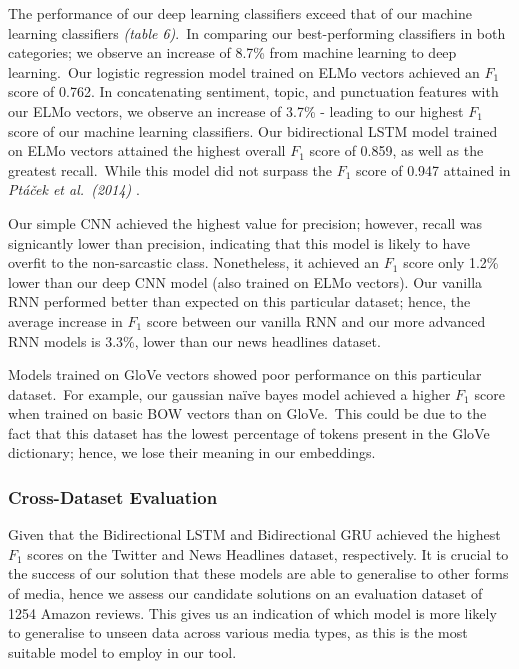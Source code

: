 \documentclass[12pt,a4paper]{article}
\begin{document}
\noindent The performance of our deep learning classifiers exceed that of our machine learning classifiers \textit{(table 6)}.\ In comparing our best-performing classifiers in both categories; we observe an increase of 8.7\% from machine learning to deep learning.\ Our logistic regression model trained on ELMo vectors achieved an $F_1$ score of 0.762. In concatenating sentiment, topic, and punctuation features with our ELMo vectors, we observe an increase of 3.7\% - leading to our highest $F_1$ score of our machine learning classifiers. Our bidirectional LSTM model trained on ELMo vectors attained the highest overall $F_1$ score of 0.859, as well as the greatest recall.\ While this model did not surpass the $F_1$ score of 0.947 attained in \textit{Pt\'a\v{c}ek et al.\ (2014)} \cite{ptavcek2014sarcasm}. 

Our simple CNN achieved the highest value for precision; however, recall was signicantly lower than precision, indicating that this model is likely to have overfit to the non-sarcastic class. Nonetheless, it achieved an $F_1$ score only 1.2\% lower than our deep CNN model (also trained on ELMo vectors). Our vanilla RNN performed better than expected on this particular dataset; hence, the average increase in $F_1$ score between our vanilla RNN and our more advanced RNN models is 3.3\%, lower than our news headlines dataset.

Models trained on GloVe vectors showed poor performance on this particular dataset.\ For example, our gaussian na\"{i}ve bayes model achieved a higher $F_1$ score when trained on basic BOW vectors than on GloVe.\ This could be due to the fact that this dataset has the lowest percentage of tokens present in the GloVe dictionary; hence, we lose their meaning in our embeddings.\\\vspace{-15pt}


\subsubsection{Cross-Dataset Evaluation}
Given that the Bidirectional LSTM and Bidirectional GRU achieved the highest $F_1$ scores on the Twitter and News Headlines dataset, respectively. It is crucial to the success of our solution that these models are able to generalise to other forms of media, hence we assess our candidate solutions on an evaluation dataset of 1254 Amazon reviews. This gives us an indication of which model is more likely to generalise to unseen data across various media types, as this is the most suitable model to employ in our tool.
\end{document}

